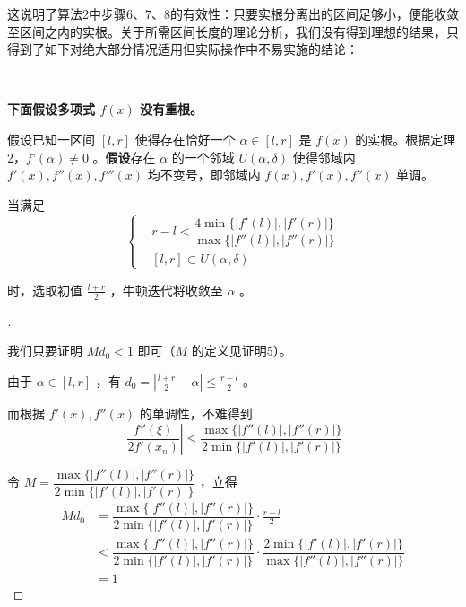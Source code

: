 	这说明了算法2中步骤6、7、8的有效性：只要实根分离出的区间足够小，便能收敛至区间之内的实根。关于所需区间长度的理论分析，我们没有得到理想的结果，只得到了如下对绝大部分情况适用但实际操作中不易实施的结论：
	
	\begin{theorem}[无重根条件下理想收敛结果的初值条件]~
		
		\textbf{下面假设多项式 $f(x)$ 没有重根。}
		
		假设已知一区间 $[l, r]$ 使得存在恰好一个 $\alpha \in [l, r]$ 是 $f(x)$ 的实根。根据定理2，$f’(\alpha) \neq 0$ 。\textbf{假设}存在 $\alpha$ 的一个邻域 $U(\alpha, \delta)$ 使得邻域内 $f'(x), f''(x), f'''(x)$ 均不变号，即邻域内 $f(x), f'(x), f''(x)$ 单调。
		
		当满足
		$$
		\left\{
		\begin{aligned}
			& r - l < \dfrac{4\min\{|f'(l)|, |f'(r)|\}}{\max\{|f''(l)|, |f''(r)|\}} \\
			& [l, r] \subset U(\alpha, \delta)
		\end{aligned}
		\right.
		$$
		
		时，选取初值 $\frac{l + r}{2}$ ，牛顿迭代将收敛至 $\alpha$ 。
		
		
	\end{theorem}

	\begin{proof}[]~
		
		我们只要证明 $Md_0 < 1$ 即可（$M$ 的定义见证明5）。
		
		由于 $\alpha \in [l, r]$ ，有 $d_0 = \left|\frac{l + r}{2} - \alpha\right| \le \frac{r - l}{2}$ 。
		
		而根据 $f'(x), f''(x)$ 的单调性，不难得到
		$$
		\left|\frac{f''(\xi)}{2f'(x_n)}\right| \le \dfrac{\max\{|f''(l)|, |f''(r)|\}}{2\min\{|f'(l)|, |f'(r)|\}}
		$$
		
		令 $M = \dfrac{\max\{|f''(l)|, |f''(r)|\}}{2\min\{|f'(l)|, |f'(r)|\}}$ ，立得
		$$
		\begin{aligned}
		Md_0 & = \dfrac{\max\{|f''(l)|, |f''(r)|\}}{2\min\{|f'(l)|, |f'(r)|\}} \cdot \frac{r - l}{2} \\
		& < \dfrac{\max\{|f''(l)|, |f''(r)|\}}{2\min\{|f'(l)|, |f'(r)|\}} \cdot \dfrac{2\min\{|f'(l)|, |f'(r)|\}}{\max\{|f''(l)|, |f''(r)|\}} \\
		& = 1
		\end{aligned}
		$$
		\qedhere
		
		
	\end{proof}

